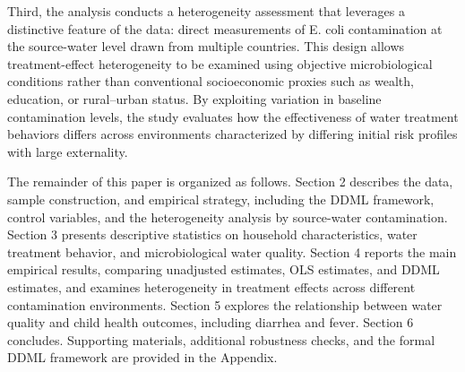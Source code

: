 \documentclass [11pt]{article}
\theoremstyle{plain}
\theoremstyle{definition}
\theoremstyle{remark}
\newcommand{\1}{\bm{1}}
\begin{document}
Third, the analysis conducts a heterogeneity assessment that leverages a distinctive feature of the data: direct measurements of E. coli contamination at the source-water level drawn from multiple countries. This design allows treatment-effect heterogeneity to be examined using objective microbiological conditions rather than conventional socioeconomic proxies such as wealth, education, or rural–urban status. By exploiting variation in baseline contamination levels, the study evaluates how the effectiveness of water treatment behaviors differs across environments characterized by differing initial risk profiles with large externality.


The remainder of this paper is organized as follows. Section 2 describes the data, sample construction, and empirical strategy, including the DDML framework, control variables, and the heterogeneity analysis by source-water contamination. Section 3 presents descriptive statistics on household characteristics, water treatment behavior, and microbiological water quality. Section 4 reports the main empirical results, comparing unadjusted estimates, OLS estimates, and DDML estimates, and examines heterogeneity in treatment effects across different contamination environments. Section 5 explores the relationship between water quality and child health outcomes, including diarrhea and fever. Section 6 concludes. Supporting materials, additional robustness checks, and the formal DDML framework are provided in the Appendix.
\end{document}
